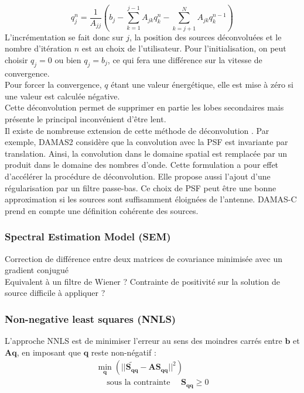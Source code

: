 \begin{equation}
	q_j^n= \frac{1}{A_{jj}}\left(b_j -\sum_{k=1}^{j-1}A_{jk}q_k^{n} - \sum_{k=j+1}^{N}A_{jk}q_k^{n-1} \right)
\end{equation}
L'incrémentation se fait donc sur $j$, la position des sources déconvoluées et le nombre d'itération $n$ est au choix de l'utilisateur. Pour l'initialisation, on peut choisir $q_j=0$ ou bien $q_j=b_j$, ce qui fera une différence sur la vitesse de convergence.\\
Pour forcer la convergence, $q$ étant une valeur énergétique, elle est mise à zéro si une valeur est calculée négative.\\
Cette déconvolution permet de supprimer en partie les lobes secondaires mais présente le principal inconvénient d'être lent.\\

Il existe de nombreuse extension de cette méthode de déconvolution \citep{Dougherty2005}. Par exemple, DAMAS2 considère que la convolution avec la PSF est invariante par translation. Ainsi, la convolution dans le domaine spatial est remplacée par un produit dans le domaine des nombres d'onde. Cette formulation a pour effet d'accélérer la procédure de déconvolution. Elle propose aussi l'ajout d'une régularisation par un filtre passe-bas. Ce choix de PSF peut être une bonne approximation si les sources sont suffisamment éloignées de l'antenne. DAMAS-C prend en compte une définition cohérente des sources.%



 
\subsubsection{Spectral Estimation Model (SEM)}
Correction de différence entre deux matrices de covariance minimisée avec un gradient conjugué \citep{Blacodon2003}\\
Equivalent à un filtre de Wiener ?
Contrainte de positivité sur la solution de source difficile à appliquer ?



\subsubsection{Non-negative least squares (NNLS)}
L'approche NNLS est de minimiser l'erreur au sens des moindres carrés entre $\bm{b}$ et $\bm{Aq}$, en imposant que $\bm{q}$ reste non-négatif : 
\begin{eqnarray}
\min_{\bm{q}}\left(||\bm{\tilde{S_{qq}}}-\bm{A}\bm{S_{qq}}||^2 \right)\\
\text{~~~~sous la contrainte~~~~}\bm{S_{qq}}\geq 0
\end{eqnarray}

